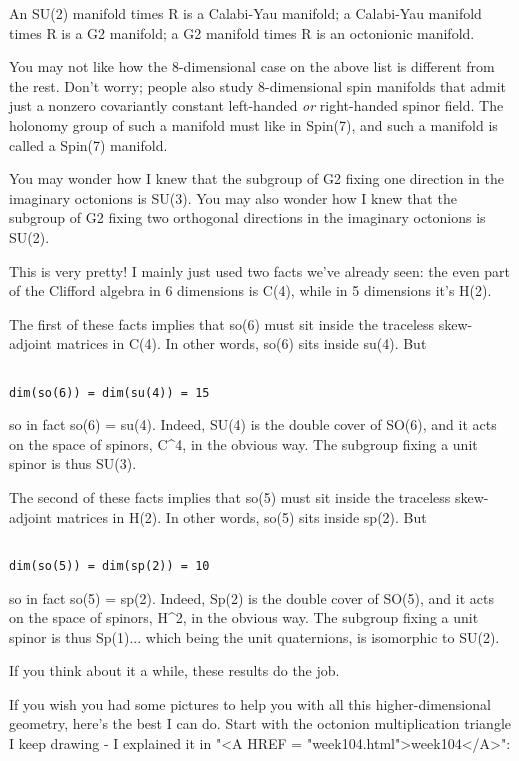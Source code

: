 An SU(2) manifold times R is a Calabi-Yau manifold;
a Calabi-Yau manifold times R is a G2 manifold;
a G2 manifold times R is an octonionic manifold.  

You may not like how the 8-dimensional case on the above list is
different from the rest.  Don't worry; people also study 8-dimensional
spin manifolds that admit just a nonzero covariantly constant
left-handed \emph{or} right-handed spinor field.  The holonomy group of
such a manifold must like in Spin(7), and such a manifold is called a
Spin(7) manifold.

You may wonder how I knew that the subgroup of G2 fixing
one direction in the imaginary octonions is SU(3).  You may
also wonder how I knew that the subgroup of G2 fixing two 
orthogonal directions in the imaginary octonions is SU(2).

This is very pretty!  I mainly just used two facts we've already 
seen: the even part of the Clifford algebra in 6 dimensions is C(4), 
while in 5 dimensions it's H(2).  

The first of these facts implies that so(6) must sit inside
the traceless skew-adjoint matrices in C(4).  In other words, 
so(6) sits inside su(4).  But 


\begin{verbatim}

dim(so(6)) = dim(su(4)) = 15
\end{verbatim}
    
so in fact so(6) = su(4).  Indeed, SU(4) is the double
cover of SO(6), and it acts on the space of spinors, C^{4}, 
in the obvious way.  The subgroup fixing a unit spinor is 
thus SU(3).   

The second of these facts implies that so(5) must sit inside
the traceless skew-adjoint matrices in H(2).  In other words,
so(5) sits inside sp(2).  But


\begin{verbatim}

dim(so(5)) = dim(sp(2)) = 10
\end{verbatim}
    
so in fact so(5) = sp(2).  Indeed, Sp(2) is the double
cover of SO(5), and it acts on the space of spinors, H^{2},
in the obvious way.  The subgroup fixing a unit spinor is
thus Sp(1)... which being the unit quaternions, is isomorphic to SU(2).

If you think about it a while, these results do the job.

If you wish you had some pictures to help you with all this
higher-dimensional geometry, here's the best I can do.  Start
with the octonion multiplication triangle I keep drawing - 
I explained it in "<A HREF = "week104.html">week104</A>": 



